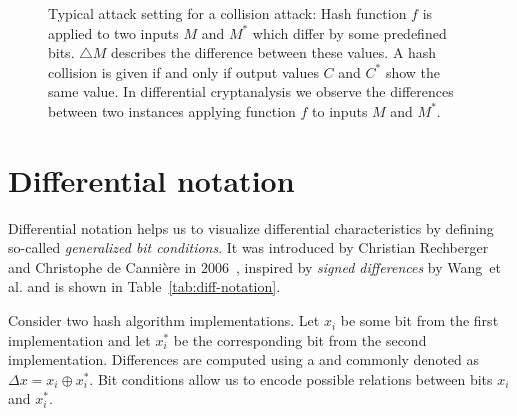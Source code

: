 \begin{figure}[pbt]
  \begin{center}
    \caption[Typical attack setting for a collision attack]{
      Typical attack setting for a collision attack:
      Hash function $f$ is applied to two inputs $M$ and $M^*$ which differ
      by some predefined bits. $\triangle M$ describes the difference between
      these values. A hash collision is given if and only if output values
      $C$ and $C^*$ show the same value. In differential cryptanalysis we observe
      the differences between two instances applying function $f$
      to inputs $M$ and $M^*$.
    }
    \label{tab:collision-attack}
  \end{center}
\end{figure}

\section{Differential notation}
\label{sec:dc-notation}
%
Differential notation helps us to visualize differential characteristics
by defining so-called \emph{generalized bit conditions}.
It was introduced by Christian Rechberger and Christophe de Canni\`ere
in 2006~\cite[Section 3.2]{char-2006}, inspired by \emph{signed differences} by
Wang~et al. and is shown in Table~\ref{tab:diff-notation}.

Consider two hash algorithm implementations. Let $x_i$ be some bit
from the first implementation and let $x_i^*$ be the corresponding bit
from the second implementation. Differences are computed using a 
and commonly denoted as $\Delta x = x_i \oplus x_i^*$.
Bit conditions allow us to encode possible relations between bits $x_i$ and $x_i^*$.

